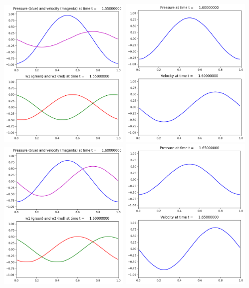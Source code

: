 \documentclass[11pt]{article}
\begin{document}
\includegraphics[width=0.475\textwidth]{frame0031fig2.png}
\vskip 10pt 
\includegraphics[width=0.475\textwidth]{frame0032fig1.png}
\includegraphics[width=0.475\textwidth]{frame0032fig2.png}
\vskip 10pt 
\includegraphics[width=0.475\textwidth]{frame0033fig1.png}
\end{document}
